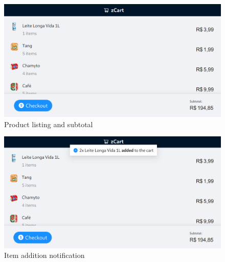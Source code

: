 \documentclass[openright]{normas-utf-tex} %
\begin{document}
\begin{figure}[H]
	\centering
	\includegraphics[width=1\textwidth]{./images/userapp.png}
	\caption[]{Product listing and subtotal}
\end{figure}

\begin{figure}[H]
	\centering
	\includegraphics[width=1\textwidth]{./images/userapp2.png}
	\caption[]{Item addition notification}
\end{figure}
\end{document}
